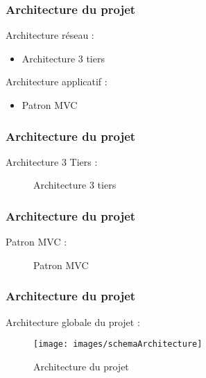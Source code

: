 \begin{frame}
  \frametitle{Architecture du projet}
	
  Architecture réseau :
      \begin{itemize}
        \item Architecture 3 tiers
      \end{itemize}
  Architecture applicatif :
      \begin{itemize}
        \item Patron MVC
      \end{itemize}
\end{frame}

\begin{frame}
  \frametitle{Architecture du projet}
  
  Architecture 3 Tiers :
  
  \begin{figure}[!h]
	\begin{center}
	
	\caption{\label{3tiers_schema} Architecture 3 tiers}
	\end{center}
  \end{figure}

\end{frame}




\begin{frame}
  \frametitle{Architecture du projet}
  
	Patron MVC :

  \begin{figure}[!h]
	\begin{center}
	
	\caption{\label{3tiers_schema} Patron MVC}
	\end{center}
  \end{figure}	
	
\end{frame}



\begin{frame}
  \frametitle{Architecture du projet}
  
	Architecture globale du projet :

  \begin{figure}[!h]
	\begin{center}
	\texttt{[image: images/schemaArchitecture]}
	\caption{\label{archi_schema} Architecture du projet}
	\end{center}
  \end{figure}	
	
\end{frame}